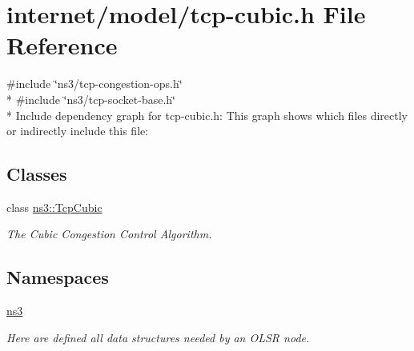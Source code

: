 \hypertarget{tcp-cubic_8h}{}\section{internet/model/tcp-\/cubic.h File Reference}
\label{tcp-cubic_8h}
{\ttfamily \#include \char`\"{}ns3/tcp-\/congestion-\/ops.\+h\char`\"{}}\\*
{\ttfamily \#include \char`\"{}ns3/tcp-\/socket-\/base.\+h\char`\"{}}\\*
Include dependency graph for tcp-\/cubic.h\+:
This graph shows which files directly or indirectly include this file\+:
\subsection*{Classes}
\begin{DoxyCompactItemize}
\item 
class \hyperlink{classns3_1_1TcpCubic}{ns3\+::\+Tcp\+Cubic}
\begin{DoxyCompactList}\small\item\em The Cubic Congestion Control Algorithm. \end{DoxyCompactList}\end{DoxyCompactItemize}
\subsection*{Namespaces}
\begin{DoxyCompactItemize}
\item 
 \hyperlink{namespacens3}{ns3}
\begin{DoxyCompactList}\small\item\em Here are defined all data structures needed by an O\+L\+SR node. \end{DoxyCompactList}\end{DoxyCompactItemize}
